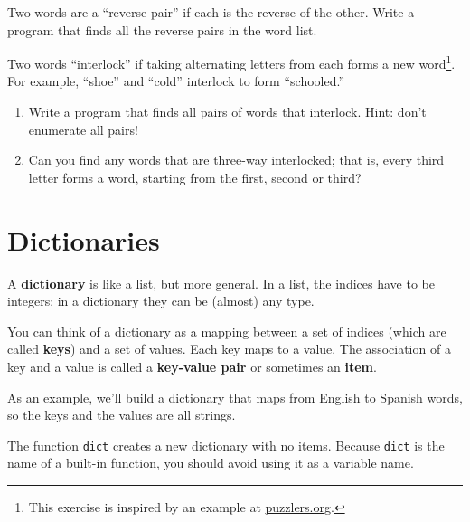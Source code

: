 \documentclass[10pt]{book}
\begin{document}
\begin{ex}

Two words are a ``reverse pair'' if each is the reverse of the
other.  Write a program that finds all the reverse pairs in the
word list. 
\end{ex}

\begin{ex}

Two words ``interlock'' if taking alternating letters from each forms
a new word\footnote{This exercise is inspired by an example at
  \url{puzzlers.org}.}.  For example, ``shoe'' and ``cold''
interlock to form ``schooled.''

\begin{enumerate}

\item Write a program that finds all pairs of words that interlock.
  Hint: don't enumerate all pairs!

\item Can you find any words that are three-way interlocked; that is,
  every third letter forms a word, starting from the first, second or
  third?

\end{enumerate}
\end{ex}


\chapter{Dictionaries}


A {\bf dictionary} is like a list, but more general.  In a list,
the indices have to be integers; in a dictionary they can
be (almost) any type.

You can think of a dictionary as a mapping between a set of indices
(which are called {\bf keys}) and a set of values.  Each key maps to a
value.  The association of a key and a value is called a {\bf
  key-value pair} or sometimes an {\bf item}.

As an example, we'll build a dictionary that maps from English
to Spanish words, so the keys and the values are all strings.

The function {\tt dict} creates a new dictionary with no items.
Because {\tt dict} is the name of a built-in function, you
should avoid using it as a variable name.
\end{document}
